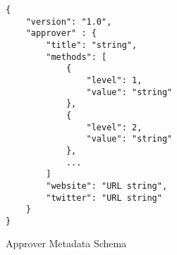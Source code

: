 \begin{listing}
\begin{verbatim}
{     
    "version": "1.0",
    "approver" : {
        "title": "string",
        "methods": [
            {
                "level": 1,
                "value": "string"
            },
            {
                "level": 2,
                "value": "string"
            },
            ...
        ]
        "website": "URL string",
        "twitter": "URL string"
    }
}
\end{verbatim}
\caption{Approver Metadata Schema} 
\label{approver-metadata-json-schema}
\end{listing}
